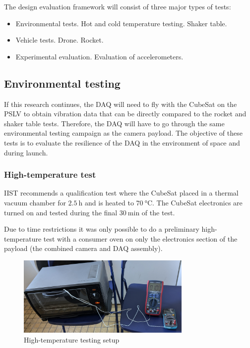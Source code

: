 \documentclass[a4paper,11pt]{article}
\begin{document}
The design evaluation framework will consist of three major types of tests:

\begin{itemize}
  \item Environmental tests.
        \subitem Hot and cold temperature testing.
        \subitem Shaker table.
  \item Vehicle tests.
        \subitem Drone.
        \subitem Rocket.
  \item Experimental evaluation.
        \subitem Evaluation of accelerometers.
\end{itemize}

\subsection{Environmental testing}

If this research continues, the DAQ will need to fly with the CubeSat on the PSLV to obtain vibration data that can be directly compared to the rocket and shaker table tests. Therefore, the DAQ will have to go through the same environmental testing campaign as the camera payload. The objective of these tests is to evaluate the resilience of the DAQ in the environment of space and during launch.

\subsubsection{High-temperature test}
\label{sec:htemp-test-framework}
IIST recommends a qualification test where the CubeSat placed in a thermal vacuum chamber for $\SI{2.5}{\hour}$ and is heated to $\SI{70}{\degreeCelsius}$. The CubeSat electronics are turned on and tested during the final $\SI{30}{\minute}$ of the test.

Due to time restrictions it was only possible to do a preliminary high-temperature test with a consumer oven on only the electronics section of the payload (the combined camera and DAQ assembly).

\begin{figure}[H]
  \centering
  \includegraphics[width=0.75\textwidth]{images/oven_test.jpg}
  \caption{High-temperature testing setup}
  \label{fig:temperature-testing-oven}
\end{figure}
\end{document}
